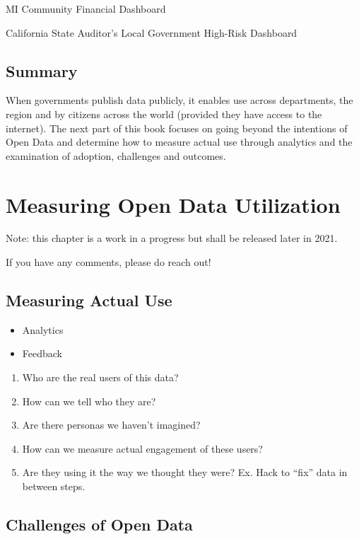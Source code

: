 \documentclass[
  openany]{book}
\providecommand{\tightlist}{%
  \setlength{\itemsep}{0pt}\setlength{\parskip}{0pt}}
\begin{document}
MI Community Financial Dashboard

California State Auditor's Local Government High-Risk Dashboard

\hypertarget{summary}{%
\section{Summary}\label{summary}}

When governments publish data publicly, it enables use across departments, the region and by citizens across the world (provided they have access to the internet). The next part of this book focuses on going beyond the intentions of Open Data and determine how to measure actual use through analytics and the examination of adoption, challenges and outcomes.

\hypertarget{use}{%
\chapter{Measuring Open Data Utilization}\label{use}}

Note: this chapter is a work in a progress but shall be released later in 2021.

If you have any comments, please do reach out!

\hypertarget{measuring-actual-use}{%
\section{Measuring Actual Use}\label{measuring-actual-use}}

\begin{itemize}
\tightlist
\item
  Analytics
\item
  Feedback
\end{itemize}

\begin{enumerate}
\def\labelenumi{\arabic{enumi}.}
\tightlist
\item
  Who are the real users of this data?
\item
  How can we tell who they are?
\item
  Are there personas we haven't imagined?
\item
  How can we measure actual engagement of these users?
\item
  Are they using it the way we thought they were? Ex. Hack to ``fix'' data in between steps.
\end{enumerate}

\hypertarget{challenges-of-open-data}{%
\section{Challenges of Open Data}\label{challenges-of-open-data}}
\end{document}
